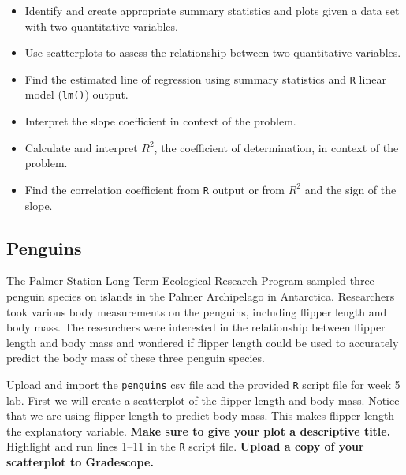 \documentclass[
]{report}
\begin{document}
\begin{itemize}
\item
  Identify and create appropriate summary statistics and plots
  given a data set with two quantitative variables.
\item
  Use scatterplots to assess the relationship between two quantitative variables.
\item
  Find the estimated line of regression using summary statistics and \texttt{R} linear model (\texttt{lm()}) output.
\item
  Interpret the slope coefficient in context of the problem.
\item
  Calculate and interpret \(R^2\), the coefficient of determination, in context of the problem.
\item
  Find the correlation coefficient from \texttt{R} output or from \(R^2\) and the sign of the slope.
\end{itemize}

\hypertarget{penguins}{%
\subsection{Penguins}\label{penguins}}

The Palmer Station Long Term Ecological Research Program sampled three penguin species on islands in the Palmer Archipelago in Antarctica. Researchers took various body measurements on the penguins, including flipper length and body mass. The researchers were interested in the relationship between flipper length and body mass and wondered if flipper length could be used to accurately predict the body mass of these three penguin species.

Upload and import the \texttt{penguins} csv file and the provided \texttt{R} script file for week 5 lab. First we will create a scatterplot of the flipper length and body mass. Notice that we are using flipper length to predict body mass. This makes flipper length the explanatory variable. \textbf{Make sure to give your plot a descriptive title.} Highlight and run lines 1--11 in the \texttt{R} script file. \textbf{Upload a copy of your scatterplot to Gradescope.}
\end{document}
